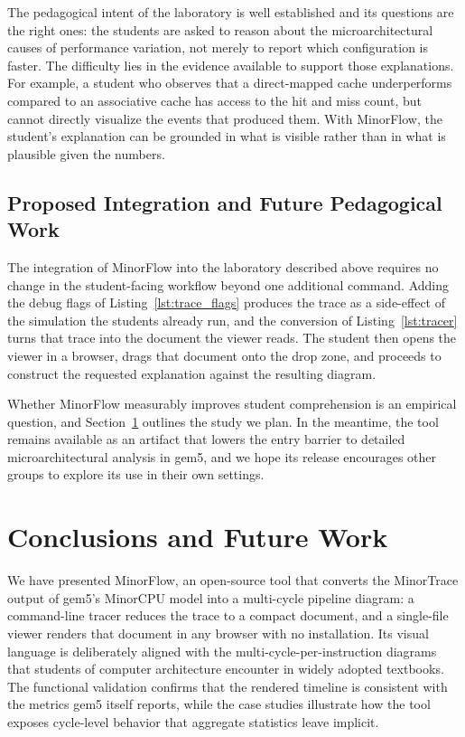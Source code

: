 \documentclass[runningheads,a4paper]{llncs}
\begin{document}
The pedagogical intent of the laboratory is well established and its questions are the right ones: the students are asked to reason about the microarchitectural causes of performance variation, not merely to report which configuration is faster. The difficulty lies in the evidence available to support those explanations. For example, a student who observes that a direct-mapped cache underperforms compared to an associative cache has access to the hit and miss count, but cannot directly visualize the events that produced them. With MinorFlow, the student's explanation can be grounded in what is visible rather than in what is plausible given the numbers. 

\subsection{Proposed Integration and Future Pedagogical Work}

The integration of MinorFlow into the laboratory described above requires no change in the student-facing workflow beyond one additional command. Adding the debug flags of Listing~\ref{lst:trace_flags} produces the trace as a side-effect of the simulation the students already run, and the conversion of Listing~\ref{lst:tracer} turns that trace into the document the viewer reads. The student then opens the viewer in a browser, drags that document onto the drop zone, and proceeds to construct the requested explanation against the resulting diagram.

Whether MinorFlow measurably improves student comprehension is an empirical question, and Section~\ref{sec:conclusions} outlines the study we plan. In the meantime, the tool remains available as an artifact that lowers the entry barrier to detailed microarchitectural analysis in gem5, and we hope its release encourages other groups to explore its use in their own settings.

\section{Conclusions and Future Work}
\label{sec:conclusions}

We have presented MinorFlow, an open-source tool that converts the MinorTrace output of gem5's MinorCPU model into a multi-cycle pipeline diagram: a command-line tracer reduces the trace to a compact document, and a single-file viewer renders that document in any browser with no installation. Its visual language is deliberately aligned with the multi-cycle-per-instruction diagrams that students of computer architecture encounter in widely adopted textbooks. The functional validation confirms that the rendered timeline is consistent with the metrics gem5 itself reports, while the case studies illustrate how the tool exposes cycle-level behavior that aggregate statistics leave implicit.
\end{document}
